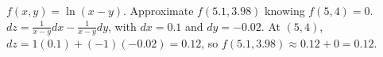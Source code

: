 {$f(x,y) = \ln(x-y)$. Approximate $f(5.1,3.98)$ knowing $f(5,4) = 0$. 
}
{$dz = \frac1{x-y}dx -\frac{1}{x-y}dy$, with $dx = 0.1$ and $dy = -0.02$. At $(5,4)$, $dz = 1(0.1) + (-1)(-0.02) = 0.12$, so $f(5.1,3.98) \approx 0.12+0 = 0.12$.
}